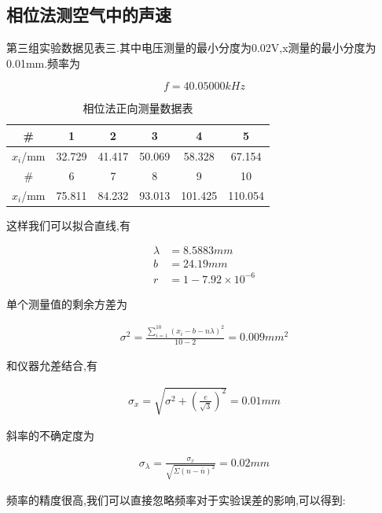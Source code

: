 \documentclass[a4paper,10pt,notitlepage]{article}
\begin{document}
\subsection{相位法测空气中的声速}

	第三组实验数据见表三.其中电压测量的最小分度为0.02V,x测量的最小分度为0.01mm.频率为
	
\begin{equation}
	f = 40.05000 kHz
\end{equation}

\begin{table}[htbp]
\centering

	\begin{tabular}{|c|c|c|c|c|c|}
	\hline
	\# & 1 & 2 & 3 & 4 & 5 \\
	\hline
	$x_{i}$/mm & 32.729 & 41.417 & 50.069 & 58.328 & 67.154 \\
	\hline
	\# & 6 & 7 & 8 & 9 & 10 \\
	\hline
	$x_{i}$/mm & 75.811 & 84.232 & 93.013 & 101.425 & 110.054 \\
	\hline
	\end{tabular}
	\caption{相位法正向测量数据表}

\end{table}

	这样我们可以拟合直线,有
	
\begin{align}
	\lambda &= 8.5883mm \\
	b &= 24.19 mm \\
	r &= 1 - 7.92\times10^{-6}
\end{align}

	单个测量值的剩余方差为
	
\begin{align}
	\sigma ^ 2 = \frac{\sum_{i = 1}^{10}(x_i - b - n\lambda )^2}{10 - 2} = 0.009 mm^2 
\end{align}

	和仪器允差结合,有
	
\begin{align}
	\sigma_x = \sqrt{\sigma^2 + (\frac{e}{\sqrt{3}})^2} = 0.01 mm 
\end{align}

	斜率的不确定度为
	
\begin{align}
	\sigma_{\lambda} = \frac{\sigma_x}{\sqrt{\Sigma(n - \bar{n})^2}} = 0.02mm
\end{align}

	频率的精度很高,我们可以直接忽略频率对于实验误差的影响,可以得到:
	
\end{document}
